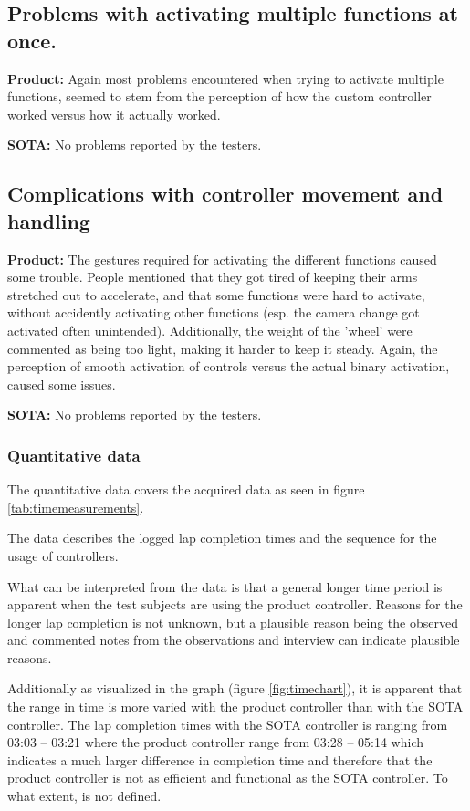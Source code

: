 \subsection*{Problems with activating multiple functions at once.}
\noindent\textbf{Product: }\newline
Again most problems encountered when trying to activate multiple functions, seemed to stem from the perception of how the custom controller worked versus how it actually worked.
\bigskip

\noindent\textbf{SOTA:}\newline
No problems reported by the testers.


\subsection*{Complications with controller movement and handling}
\noindent\textbf{Product: }\newline
The gestures required for activating the different functions caused some trouble. People mentioned that they got tired of keeping their arms stretched out to accelerate, and that some functions were hard to activate, without accidently activating other functions (esp. the camera change got activated often unintended). Additionally, the weight of the 'wheel' were commented as being too light, making it harder to keep it steady. Again, the perception of smooth activation of controls versus the actual binary activation, caused some issues.
\bigskip

\noindent\textbf{SOTA:}\newline
No problems reported by the testers.


\subsubsection{Quantitative data}
The quantitative data covers the acquired data as seen in figure \ref{tab:timemeasurements}.
\bigskip

The data describes the logged lap completion times and the sequence for the usage of controllers.
\bigskip

What can be interpreted from the data is that a general longer time period is apparent when the test subjects are using the product controller. 
Reasons for the longer lap completion is not unknown, but a plausible reason being the observed and commented notes from the observations and interview can indicate plausible reasons.
\bigskip

Additionally as visualized in the graph (figure \ref{fig:timechart}), it is apparent that the range in time is more varied with the product controller than with the SOTA controller. The lap completion times with the SOTA controller is ranging from 03:03 – 03:21 where the product controller range from 03:28 – 05:14 which indicates a much larger difference in completion time and therefore that the product controller is not as efficient and functional as the SOTA controller. To what extent, is not defined. 
\bigskip

